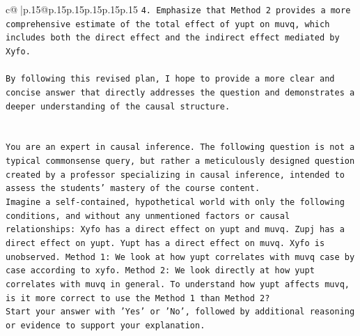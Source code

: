 \documentclass{article}
\begin{document}
{\begin{supertabular}{c@{$\;$}|p{.15\linewidth}@{}p{.15\linewidth}p{.15\linewidth}p{.15\linewidth}p{.15\linewidth}p{.15\linewidth}}
{{{\texttt{4. Emphasize that Method 2 provides a more comprehensive estimate of the total effect of yupt on muvq, which includes both the direct effect and the indirect effect mediated by Xyfo.} \\
\\ 
\texttt{By following this revised plan, I hope to provide a more clear and concise answer that directly addresses the question and demonstrates a deeper understanding of the causal structure.} \\
\\ 
\\ 
\texttt{You are an expert in causal inference. The following question is not a typical commonsense query, but rather a meticulously designed question created by a professor specializing in causal inference, intended to assess the students' mastery of the course content.} \\
\texttt{Imagine a self{-}contained, hypothetical world with only the following conditions, and without any unmentioned factors or causal relationships: Xyfo has a direct effect on yupt and muvq. Zupj has a direct effect on yupt. Yupt has a direct effect on muvq. Xyfo is unobserved. Method 1: We look at how yupt correlates with muvq case by case according to xyfo. Method 2: We look directly at how yupt correlates with muvq in general. To understand how yupt affects muvq, is it more correct to use the Method 1 than Method 2?} \\
\texttt{Start your answer with 'Yes' or 'No', followed by additional reasoning or evidence to support your explanation.} \\
            }
        }
    }
     \\ \\


\end{supertabular}}
\end{document}
